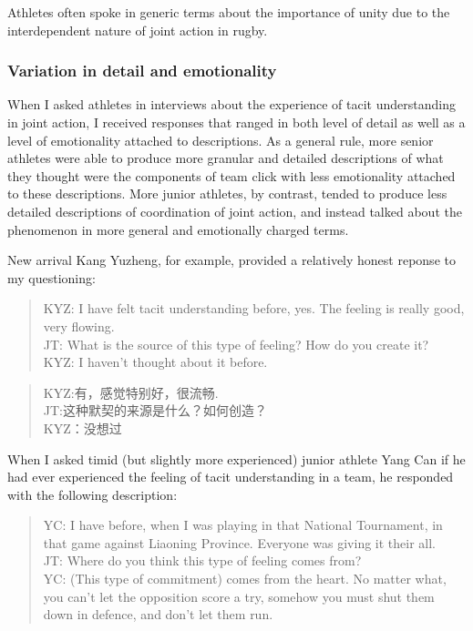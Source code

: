 \begin{CJK}{UTF8}{gbsn}
Athletes often spoke in generic terms about the importance of unity due to the interdependent nature of joint action in rugby.







\subsubsection{Variation in detail and emotionality}
When I asked athletes in interviews about the experience of tacit understanding in joint action, I received responses that ranged in both level of detail as well as a level of emotionality attached to descriptions.  As a general rule, more senior athletes were able to produce more granular and detailed descriptions of what they thought were the components of team click with less emotionality attached to these descriptions.  More junior athletes, by contrast, tended to produce less detailed descriptions of coordination of joint action, and instead talked about the phenomenon in more general and emotionally charged terms.

New arrival Kang Yuzheng, for example, provided a relatively honest reponse to my questioning:

\begin{quote}
  KYZ: I have felt tacit understanding before, yes.  The feeling is really good, very flowing. \\
  JT: What is the source of this type of feeling? How do you create it? \\
  KYZ: I haven't thought about it before.
\end{quote}

\begin{quote}
  KYZ:有，感觉特别好，很流畅. \\
  JT:这种默契的来源是什么？如何创造？\\
  KYZ：没想过
\end{quote}


When I asked timid (but slightly more experienced) junior athlete Yang Can if he had ever experienced the feeling of tacit understanding in a team, he responded with the following description:

    \begin{quote}
      YC: I have before, when I was playing in that National Tournament, in that game against Liaoning Province.  Everyone was giving it their all. \\
      JT: Where do you think this type of feeling comes from? \\
      YC: (This type of commitment) comes from the heart. No matter what, you can’t let the opposition score a try, somehow you must shut them down in defence, and don’t let them run.
    \end{quote}


\end{CJK}
